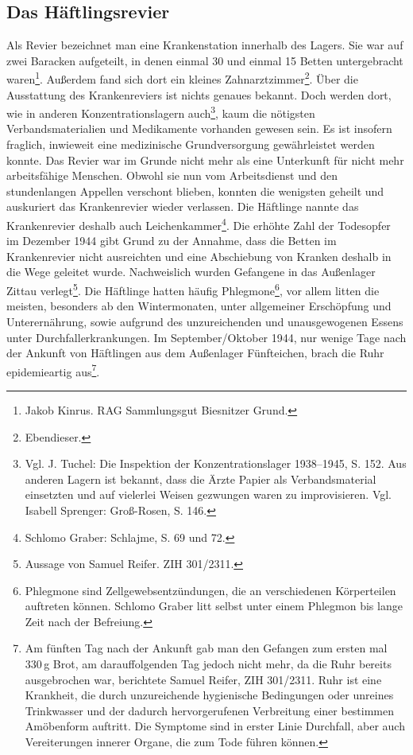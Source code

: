 \subsection{Das Häftlingsrevier}
\label{krank}
Als Revier bezeichnet man eine Krankenstation innerhalb des Lagers. Sie war auf zwei Baracken aufgeteilt, in denen einmal 30 und einmal 15 Betten untergebracht waren\footnote{Jakob Kinrus. RAG Sammlungsgut Biesnitzer Grund.}. Außerdem fand sich dort ein kleines Zahnarztzimmer\footnote{Ebendieser.}. Über die Ausstattung des Krankenreviers ist nichts genaues bekannt. Doch werden dort, wie in anderen Konzentrationslagern auch\footnote{Vgl. J. Tuchel: Die Inspektion der Konzentrationslager 1938--1945, S. 152. Aus anderen Lagern ist bekannt, dass die Ärzte Papier als Verbandsmaterial einsetzten und auf vielerlei Weisen gezwungen waren zu improvisieren. Vgl. Isabell Sprenger: Groß-Rosen, S. 146.}, kaum die nötigsten Verbandsmaterialien und Medikamente vorhanden gewesen sein. Es ist insofern fraglich, inwieweit eine medizinische Grundversorgung gewährleistet werden konnte.
\newline
Das Revier war im Grunde nicht mehr als eine Unterkunft für nicht mehr arbeitsfähige Menschen. Obwohl sie nun vom Arbeitsdienst und den stundenlangen Appellen verschont blieben, konnten die wenigsten geheilt und auskuriert das Krankenrevier wieder verlassen. Die Häftlinge nannte das Krankenrevier deshalb auch \glqq Leichenkammer\grqq\footnote{Schlomo Graber: Schlajme, S. 69 und 72.}.
Die erhöhte Zahl der Todesopfer im Dezember 1944 gibt Grund zu der Annahme, dass die Betten im Krankenrevier nicht ausreichten und eine Abschiebung von Kranken deshalb in die Wege geleitet wurde. Nachweislich wurden Gefangene in das Außenlager Zittau verlegt\footnote{Aussage von Samuel Reifer. ZIH 301/2311.}.\newline
Die Häftlinge hatten häufig Phlegmone\footnote{Phlegmone sind Zellgewebsentzündungen, die an verschiedenen Körperteilen auftreten können. Schlomo Graber litt selbst unter einem Phlegmon bis lange Zeit nach der Befreiung.}, vor allem litten die meisten, besonders ab den Wintermonaten, unter allgemeiner Erschöpfung und Unterernährung, sowie aufgrund des unzureichenden und unausgewogenen Essens unter Durchfallerkrankungen. Im September/Oktober 1944, nur wenige Tage nach der Ankunft von Häftlingen aus dem Außenlager Fünfteichen, brach die Ruhr epidemieartig aus\footnote{Am fünften Tag nach der Ankunft gab man den Gefangen zum ersten mal 330\,g Brot, am darauffolgenden Tag jedoch nicht mehr, da die Ruhr bereits ausgebrochen war, berichtete Samuel Reifer, ZIH 301/2311. Ruhr ist eine Krankheit, die durch unzureichende hygienische Bedingungen oder unreines Trinkwasser und der dadurch hervorgerufenen Verbreitung einer bestimmen Amöbenform auftritt. Die Symptome sind in erster Linie Durchfall, aber auch Vereiterungen innerer Organe, die zum Tode führen können.}.
